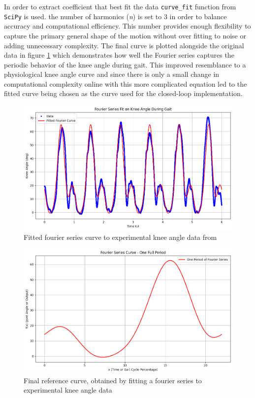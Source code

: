 In order to extract coefficient that best fit the data \texttt{curve\_fit}  function from \texttt{SciPy} is used. the number of harmonics (\textit{n}) is set to 3 in order to balance accuracy and computational efficiency. This number provides enough flexibility to capture the primary general shape of the motion without over fitting to noise or adding unnecessary complexity. The  final curve is plotted alongside the original data in figure \ref{fig:kneeangleref} which demonstrates how well the Fourier series captures the periodic behavior of the knee angle during gait. This improved resemblance to a physiological knee angle curve and since there is only a small change in computational complexity online with this more complicated equation led to the fitted curve being chosen as the curve used for the closed-loop implementation.
\begin{figure} [h]
    \centering
    \includegraphics[width=0.99\linewidth]{images/goodkneeangleref.png}
    \caption{Fitted fourier series curve to experimental knee angle data from \cite{camargo_comprehensive_2021}}
    \label{fig:kneeangleref}
\end{figure}
\begin{figure} [h]
    \centering
    \includegraphics[width=0.85\linewidth]{images/fittedKneeAngleRef.png}
    \caption{Final reference curve, obtained by fitting a fourier series to experimental knee angle data}
    \label{fig:enter-label}
\end{figure}
\newline

